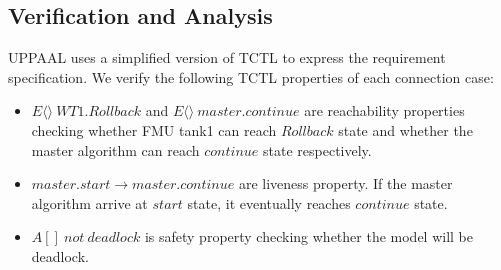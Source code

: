 \subsection{Verification and Analysis}
UPPAAL uses a simplified version of TCTL \cite{BouchenebGR09} to express the requirement specification. We verify the following TCTL properties of each connection case:
\begin{itemize}
\item
$E\langle\rangle~WT1.Rollback$ and $E\langle\rangle~master.continue$ are reachability properties checking whether FMU tank1 can reach $Rollback$ state and whether the master algorithm can reach $continue$ state respectively.
\item
$master.start \rightarrow master.continue$ are liveness property. If the master algorithm arrive at $start$ state, it eventually reaches $continue$ state.
\item 
$A[]~not~deadlock$ is safety property checking whether the model will be deadlock.
\end{itemize}

